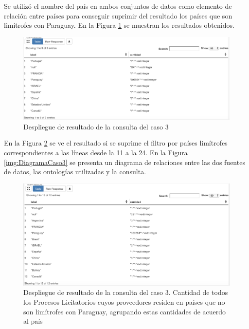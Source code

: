 Se utilizó el nombre del país en ambos conjuntos de datos como elemento de relación entre países para conseguir suprimir del resultado los países que son limítrofes con Paraguay. En la Figura \ref{img:caso3Resultado1} se muestran los resultados obtenidos.


\begin{figure}[ht!]
    \centering
    \includegraphics[width=150mm]{figuras/caso3Resultado1.png}
    \caption{Despliegue de resultado de la consulta del caso 3}
    \label{img:caso3Resultado1}
 \end{figure}


En la Figura \ref{img:caso3Resultado2} se ve el resultado si se suprime el filtro por países limítrofes correspondientes a las líneas desde la 11 a la 24. En la Figura \ref{img:DiagramaCaso3} se presenta un diagrama de relaciones entre las dos fuentes de datos, las ontologías utilizadas y la consulta.


 \begin{figure}[ht!]
    \centering
    \includegraphics[width=150mm]{figuras/caso3Resultado2.png}
    \caption{Despliegue de resultado de la consulta del caso 3. Cantidad de todos los Procesos Licitatorios cuyos proveedores residen en países que no son limítrofes con Paraguay, agrupando estas cantidades de acuerdo al país}
    \label{img:caso3Resultado2}
 \end{figure}


